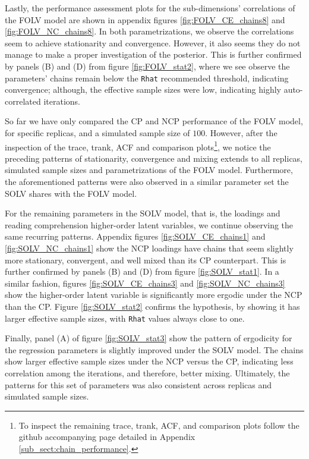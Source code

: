 Lastly, the performance assessment plots for the sub-dimensions' correlations of the FOLV model are shown in appendix figures \ref{fig:FOLV_CE_chains8} and \ref{fig:FOLV_NC_chains8}. In both parametrizations, we observe the correlations seem to achieve stationarity and convergence. However, it also seems they do not manage to make a proper investigation of the posterior. This is further confirmed by panels (B) and (D) from figure \ref{fig:FOLV_stat2}, where we see observe the parameters' chains remain below the \texttt{Rhat} recommended threshold, indicating convergence; although, the effective sample sizes were low, indicating highly auto-correlated iterations.

So far we have only compared the CP and NCP performance of the FOLV model, for specific replicas, and a simulated sample size of $100$. However, after the inspection of the trace, trank, ACF and comparison plots\footnote{To inspect the remaining trace, trank, ACF, and comparison plots follow the github accompanying page detailed in Appendix \ref{sub_sect:chain_performance}.}, we notice the preceding patterns of stationarity, convergence and mixing extends to all replicas, simulated sample sizes and parametrizations of the FOLV model. Furthermore, the aforementioned patterns were also observed in a similar parameter set the SOLV shares with the FOLV model. 

For the remaining parameters in the SOLV model, that is, the loadings and reading comprehension higher-order latent variables, we continue observing the same recurring patterns. Appendix figures \ref{fig:SOLV_CE_chains1} and \ref{fig:SOLV_NC_chains1} show the NCP loadings have chains that seem slightly more stationary, convergent, and well mixed than its CP counterpart. This is further confirmed by panels (B) and (D) from figure \ref{fig:SOLV_stat1}. In a similar fashion, figures \ref{fig:SOLV_CE_chains3} and \ref{fig:SOLV_NC_chains3} show the higher-order latent variable is significantly more ergodic under the NCP than the CP. Figure \ref{fig:SOLV_stat2} confirms the hypothesis, by showing it has larger effective sample sizes, with \texttt{Rhat} values always close to one.

Finally, panel (A) of figure \ref{fig:SOLV_stat3} show the pattern of ergodicity for the regression parameters is slightly improved under the SOLV model. The chains show larger effective sample sizes under the NCP versus the CP, indicating less correlation among the iterations, and therefore, better mixing. Ultimately, the patterns for this set of parameters was also consistent across replicas and simulated sample sizes.

